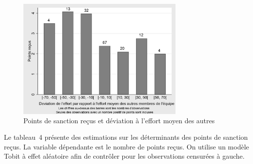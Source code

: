 \begin{Article}
\begin{refsection}[Lebourges]
\begin{figure}[h]
    \centering
    \caption{Points de sanction reçus et déviation à l'effort moyen des
autres}
    \includegraphics[height=6cm]{05_graph3.png}
\end{figure}

Le tableau~4 présente des estimations sur les déterminants des points de
sanction reçus. La variable dépendante est le nombre de points reçus. On
utilise un modèle Tobit à effet aléatoire afin de contrôler pour les
observations censurées à gauche.


\end{refsection}
\end{Article}
